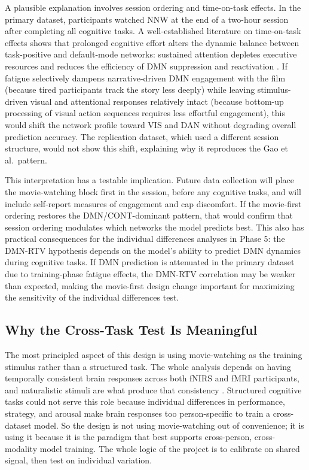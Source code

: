 A plausible explanation involves session ordering and time-on-task effects. In the primary dataset, participants watched NNW at the end of a two-hour session after completing all cognitive tasks. A well-established literature on time-on-task effects shows that prolonged cognitive effort alters the dynamic balance between task-positive and default-mode networks: sustained attention depletes executive resources and reduces the efficiency of DMN suppression and reactivation \citep{sonugabarke2007}. If fatigue selectively dampens narrative-driven DMN engagement with the film (because tired participants track the story less deeply) while leaving stimulus-driven visual and attentional responses relatively intact (because bottom-up processing of visual action sequences requires less effortful engagement), this would shift the network profile toward VIS and DAN without degrading overall prediction accuracy. The replication dataset, which used a different session structure, would not show this shift, explaining why it reproduces the Gao et al.\ pattern.

This interpretation has a testable implication. Future data collection will place the movie-watching block first in the session, before any cognitive tasks, and will include self-report measures of engagement and cap discomfort. If the movie-first ordering restores the DMN/CONT-dominant pattern, that would confirm that session ordering modulates which networks the model predicts best. This also has practical consequences for the individual differences analyses in Phase 5: the DMN-RTV hypothesis depends on the model's ability to predict DMN dynamics during cognitive tasks. If DMN prediction is attenuated in the primary dataset due to training-phase fatigue effects, the DMN-RTV correlation may be weaker than expected, making the movie-first design change important for maximizing the sensitivity of the individual differences test.

\subsection{Why the Cross-Task Test Is Meaningful}

The most principled aspect of this design is using movie-watching as the training stimulus rather than a structured task. The whole analysis depends on having temporally consistent brain responses across both fNIRS and fMRI participants, and naturalistic stimuli are what produce that consistency \citep{hasson2010, nastase2019}. Structured cognitive tasks could not serve this role because individual differences in performance, strategy, and arousal make brain responses too person-specific to train a cross-dataset model. So the design is not using movie-watching out of convenience; it is using it because it is the paradigm that best supports cross-person, cross-modality model training. The whole logic of the project is to calibrate on shared signal, then test on individual variation.

